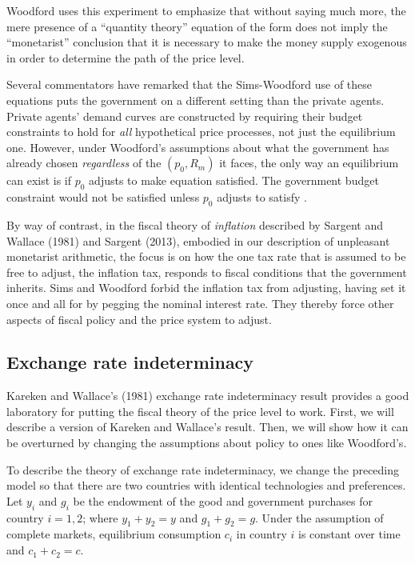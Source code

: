 Woodford uses this experiment to emphasize that without saying much
more, the mere presence of a ``quantity theory'' equation of the
form  does not imply the ``monetarist'' conclusion
that it is necessary to make the money supply exogenous in order
to determine the path of the  price level.


    Several commentators
 have remarked that the Sims-Woodford
use of these equations puts the government on a different setting
than the private agents. %
  Private agents' demand
curves are constructed by requiring their budget constraints
to hold for {\it all\/} hypothetical price processes, not just the
equilibrium  one.   However, under Woodford's assumptions
about what the government has already chosen
{\it regardless\/} of the $(p_0, R_m)$ it faces, the only way
an equilibrium can exist is if $p_0$ adjusts to make
equation   satisfied.  The government budget
constraint would not be satisfied unless $p_0$
adjusts to satisfy .


  By way of contrast,
in the fiscal theory of {\it inflation\/} described by Sargent and
Wallace (1981) and Sargent (2013), embodied in our description of
unpleasant monetarist arithmetic, the focus is on how the  one tax
rate that is assumed to be free to adjust, the inflation tax,
responds to fiscal conditions that the government inherits.  Sims
and Woodford forbid  the inflation tax from  adjusting, having set
it once and all for by pegging the nominal interest rate. They
thereby force other aspects of fiscal policy and the price system
to adjust. 
\subsection{Exchange rate indeterminacy}\label{Kareken-Wallace}%
  Kareken and Wallace's (1981)
exchange rate indeterminacy result provides a good laboratory for
putting the fiscal theory of the price level to work. First, we
will describe a version of  Kareken and Wallace's result. Then, we
will show how it can be overturned by changing the assumptions
about policy to ones like Woodford's.


To describe the theory of exchange rate indeterminacy, we change
the preceding model so that there are two countries with identical
technologies and preferences. Let $y_i$ and $g_i$ be the endowment
of the good and government purchases for country $i=1,2$; where
$y_1+y_2=y$ and $g_1+g_2=g$. Under the assumption of complete
markets, equilibrium consumption $c_i$ in country $i$
is constant over time and $c_1+c_2=c$.



